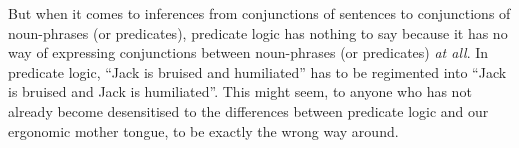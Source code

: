 But when it comes to inferences from conjunctions of sentences to conjunctions of noun-phrases (or predicates), predicate logic has nothing to say because it has no way of expressing conjunctions between noun-phrases (or predicates) \emph{at all}. In predicate logic, ``Jack is bruised and humiliated'' has to be regimented into ``Jack is bruised and Jack is humiliated''. 
This might seem, to anyone who has not already become desensitised to the differences between predicate logic and our ergonomic mother tongue, to be exactly the wrong way around.
